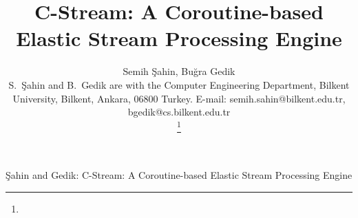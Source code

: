 



  \title{C-Stream: A Coroutine-based Elastic Stream Processing Engine}

  \author
  {
    Semih \c{S}ahin,
    Bu\u{g}ra Gedik
    \IEEEcompsocitemizethanks
    {

      \IEEEcompsocthanksitem S.\ \c{S}ahin and B.\ Gedik
            are with the
            Computer Engineering Department, Bilkent
            University, Bilkent, Ankara, 06800 Turkey. E-mail:
            semih.sahin@bilkent.edu.tr, bgedik@cs.bilkent.edu.tr
    }%
    \thanks{}
  }

           {\c{Sahin} and Gedik: C-Stream: A Coroutine-based Elastic Stream Processing Engine}
  \IEEEcompsoctitleabstractindextext{}
  \maketitle

  \IEEEpeerreviewmaketitle

  
  
  
  

  
  



